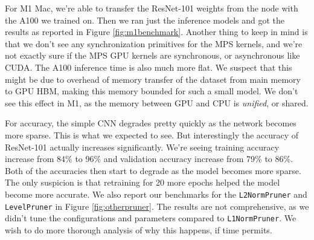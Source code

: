 \documentclass{article}
\begin{document}
For M1 Mac, we're able to transfer the ResNet-101 weights from the node with the A100 we trained on. Then we ran just the inference models and got the results as reported in Figure \ref{fig:m1benchmark}. Another thing to keep in mind is that we don't see any synchronization primitives for the MPS kernels, and we're not exactly sure if the MPS GPU kernels are synchronous, or asynchronous like CUDA. The A100 inference time is also much more flat. We suspect that this might be due to overhead of memory transfer of the dataset from main memory to GPU HBM, making this memory bounded for such a small model. We don't see this effect in M1, as the memory between GPU and CPU is \textit{unified}, or shared.


For accuracy, the simple CNN degrades pretty quickly as the network becomes more sparse. This is what we expected to see. But interestingly the accuracy of ResNet-101 actually increases significantly. We're seeing training accuracy increase from 84\% to 96\% and validation accuracy increase from 79\% to 86\%. Both of the accuracies then start to degrade as the model becomes more sparse. The only suspicion is that retraining for 20 more epochs helped the model become more accurate. We also report our benchmarks for the \verb|L2NormPruner| and \verb|LevelPruner| in Figure \ref{fig:otherpruner}. The results are not comprehensive, as we didn't tune the configurations and parameters compared to \verb|L1NormPruner|. We wish to do more thorough analysis of why this happens, if time permits.
\end{document}
